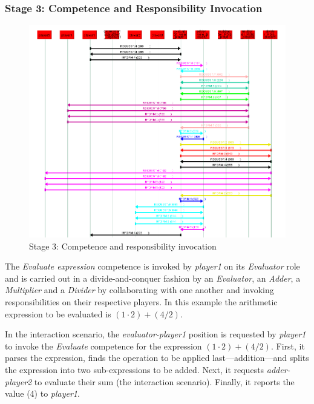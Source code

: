 \subsubsection*{Stage 3: Competence and Responsibility Invocation}

\begin{figure}[H]
	\centering
	\includegraphics[width=\textwidth]{images/examples/example2-stage3}
	\caption{Stage 3: Competence and responsibility invocation}
	\label{figure:example2-stage3}
\end{figure}

The \textit{Evaluate expression} competence is invoked by \textit{player1} on its \textit{Evaluator} role and is carried out in a divide-and-conquer fashion by an \textit{Evaluator}, an \textit{Adder}, a \textit{Multiplier} and a \textit{Divider} by collaborating with one another and invoking responsibilities on their respective players.
In this example the arithmetic expression to be evaluated is $(1\cdot2)+(4/2)$.

In the {} interaction scenario, the \textit{evaluator-player1} position is requested by \textit{player1} to invoke the \textit{Evaluate} competence for the expression $(1\cdot2)+(4/2)$.
First, it parses the expression, finds the operation to be applied last---addition---and splits the expression into two sub-expressions to be added.
Next, it requests \textit{adder-player2} to evaluate their sum (the {} interaction scenario).
Finally, it reports the value (4) to \textit{player1}.

